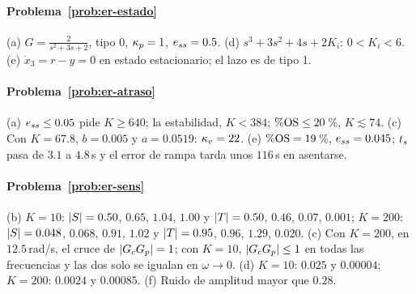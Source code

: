 \paragraph{Problema~\ref{prob:er-estado}}
(a) $G=\frac{2}{s^2+3s+2}$, tipo 0, $\kappa_p=1$, $e_{ss}=0.5$. (d) $s^3+3s^2+4s+2K_i$: $0<K_i<6$. (e) $\dot x_3=r-y=0$ en estado estacionario; el lazo es de tipo 1.

\paragraph{Problema~\ref{prob:er-atraso}}
(a) $e_{ss}\le0.05$ pide $K\ge640$; la estabilidad, $K<384$; $\%\mathrm{OS}\le20$\,\%, $K\lesssim74$. (c) Con $K=67.8$, $b=0.005$ y $a=0.0519$: $\kappa_v=22$. (e) $\%\mathrm{OS}=19$\,\%, $e_{ss}=0.045$; $t_s$ pasa de $3.1$ a $4.8$\,s y el error de rampa tarda unos $116$\,s en asentarse.

\paragraph{Problema~\ref{prob:er-sens}}
(b) $K=10$: $|S|=0.50$, $0.65$, $1.04$, $1.00$ y $|T|=0.50$, $0.46$, $0.07$, $0.001$; $K=200$: $|S|=0.048$, $0.068$, $0.91$, $1.02$ y $|T|=0.95$, $0.96$, $1.29$, $0.020$. (c) Con $K=200$, en $12.5$\,rad/s, el cruce de $|G_cG_p|=1$; con $K=10$, $|G_cG_p|\le1$ en todas las frecuencias y las dos solo se igualan en $\omega\to0$. (d) $K=10$: $0.025$ y $0.00004$; $K=200$: $0.0024$ y $0.00085$. (f) Ruido de amplitud mayor que $0.28$.

\respuestaspausas
